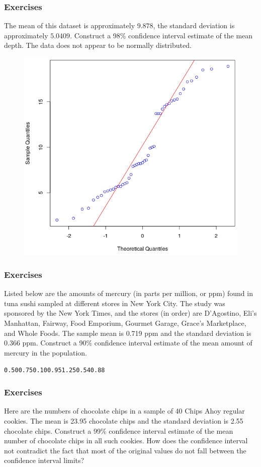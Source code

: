 \documentclass[xcolor=dvipsnames]{beamer}
\begin{document}
\begin{frame}
  \frametitle{Exercises}
The mean of this dataset is approximately $9.878$, the standard
deviation is approximately $5.0409$. Construct a 98\% confidence
interval estimate of the mean depth. The data does not appear to
be normally distributed.
\begin{figure}[h]
  \includegraphics[scale=0.3]{./diagrams/quakes.png}
\end{figure}
\end{frame}

\begin{frame}
  \frametitle{Exercises}
  {\ubung} Listed below are the amounts of mercury (in parts per
  million, or ppm) found in tuna sushi sampled at different stores in
  New York City. The study was sponsored by the New York Times, and
  the stores (in order) are D'Agostino, Eli's Manhattan, Fairway, Food
  Emporium, Gourmet Garage, Grace's Marketplace, and Whole Foods. The
  sample mean is 0.719 ppm and the standard deviation is 0.366 ppm.
  Construct a 90\% confidence interval estimate of the mean amount of
  mercury in the population.

  \begin{alltt}
0.50 0.75 0.10 0.95 1.25 0.54 0.88
  \end{alltt}
\end{frame}

\begin{frame}
  \frametitle{Exercises}
  {\ubung} Here are the numbers of chocolate chips in a sample of 40
  Chips Ahoy regular cookies. The mean is 23.95 chocolate chips and
  the standard deviation is 2.55 chocolate chips. Construct a 99\%
  confidence interval estimate of the mean number of chocolate chips
  in all such cookies. How does the confidence interval not
  contradict the fact that most of the original values do not fall
  between the confidence interval limits?
\end{frame}
\end{document}
